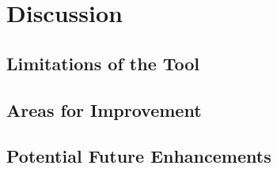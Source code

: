 \section{Discussion}
    \subsection{Limitations of the Tool}
    \subsection{Areas for Improvement}
    \subsection{Potential Future Enhancements}
